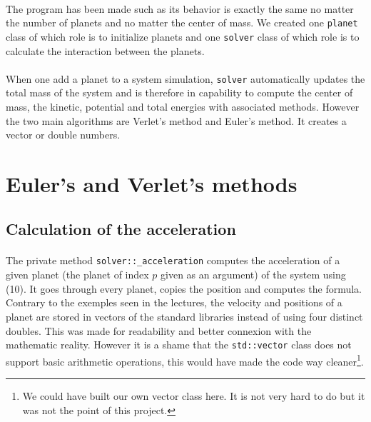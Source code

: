\documentclass[a4paper, twoside, 11pt]{report}
\theoremstyle{theorem}
\theoremstyle{remark}
\theoremstyle{exemple}
\begin{document}
    \paragraph{}The program has been made such as its behavior is exactly the same no matter the number of planets and no matter the center of mass. We created one \texttt{planet} class of which role is to initialize planets and one \texttt{solver} class of which role is to calculate the interaction between the planets.
	
	\paragraph{}When one add a planet to a system simulation, \texttt{solver} automatically updates the total mass of the system and is therefore in capability to compute the center of mass, the kinetic, potential and total energies with associated methods. However the two main algorithms are Verlet's method and Euler's method. It creates a vector or double numbers.
		
		\section{Euler's and Verlet's methods}
		
			\subsection{Calculation of the acceleration}
			
				\paragraph{}The private method \texttt{solver::\_acceleration} computes the acceleration of a given planet (the planet of index $p$ given as an argument) of the system using (10). It goes through every planet, copies the position and computes the formula. Contrary to the exemples seen in the lectures, the velocity and positions of a planet are stored in vectors of the standard libraries instead of using four distinct doubles. This was made for readability and better connexion with the mathematic reality. However it is a shame that the \texttt{std::vector} class does not support basic arithmetic operations, this would have made the code way cleaner\footnote{We could have built our own vector class here. It is not very hard to do but it was not the point of this project.}.
				
\end{document}
